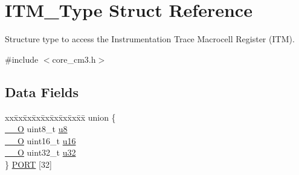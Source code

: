 \hypertarget{structITM__Type}{\section{I\-T\-M\-\_\-\-Type Struct Reference}
\label{structITM__Type}
}


Structure type to access the Instrumentation Trace Macrocell Register (I\-T\-M).  




{\ttfamily \#include $<$core\-\_\-cm3.\-h$>$}

\subsection*{Data Fields}
\begin{DoxyCompactItemize}
\item 
\begin{tabbing}
xx\=xx\=xx\=xx\=xx\=xx\=xx\=xx\=xx\=\kill
union \{\\
\>\hyperlink{core__cm3_8h_a7e25d9380f9ef903923964322e71f2f6}{\_\_O} uint8\_t \hyperlink{structITM__Type_abea77b06775d325e5f6f46203f582433}{u8}\\
\>\hyperlink{core__cm3_8h_a7e25d9380f9ef903923964322e71f2f6}{\_\_O} uint16\_t \hyperlink{structITM__Type_a12aa4eb4d9dcb589a5d953c836f4e8f4}{u16}\\
\>\hyperlink{core__cm3_8h_a7e25d9380f9ef903923964322e71f2f6}{\_\_O} uint32\_t \hyperlink{structITM__Type_a6882fa5af67ef5c5dfb433b3b68939df}{u32}\\
\} \hyperlink{structITM__Type_a4efd85680da427c5bf1dbd874c7a15a0}{PORT} \mbox{[}32\mbox{]}\\


\end{tabbing}
\end{DoxyCompactItemize}
